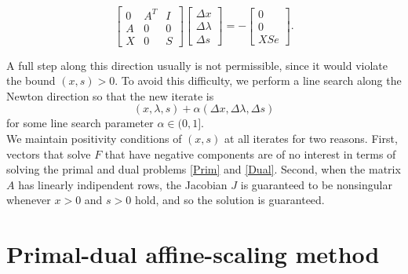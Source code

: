 \documentclass[a4paper,10 pt,titlepage,twoside]{book}
\theoremstyle{plain}
\theoremstyle{definition}
\theoremstyle{remark}
\begin{document}
\begin{equation}\label{(5.1)}
	\begin{bmatrix}
0&A^{T}&I \\A&0&0\\X&0&S
	\end{bmatrix}\begin{bmatrix}
	\Delta x\\\Delta\lambda \\\Delta s
	\end{bmatrix}=-\begin{bmatrix}
	0\\0\\XSe
	\end{bmatrix}.
\end{equation}

A full step along this direction usually is not permissible, since it would violate the bound $(x,s)>0$. To avoid this difficulty, we perform a line search along the Newton direction so that the new iterate is
\begin{equation*}
	(x,\lambda,s) +\alpha (\Delta x,\Delta \lambda,\Delta s)
\end{equation*} 
for some line search parameter $\alpha \in (0,1]$. \\We maintain positivity conditions of $(x,s)$ at all iterates for two reasons. First, vectors that solve $\mathit{F}$ that have negative components are of no interest in terms of solving the primal and dual problems \ref{Prim} and \ref{Dual}. Second, when the matrix $A$ has linearly indipendent rows, the Jacobian $J$ is guaranteed to be nonsingular whenever $x>0$ and $s>0$ hold, and so the solution is guaranteed.

\section{Primal-dual affine-scaling method}
\end{document}
